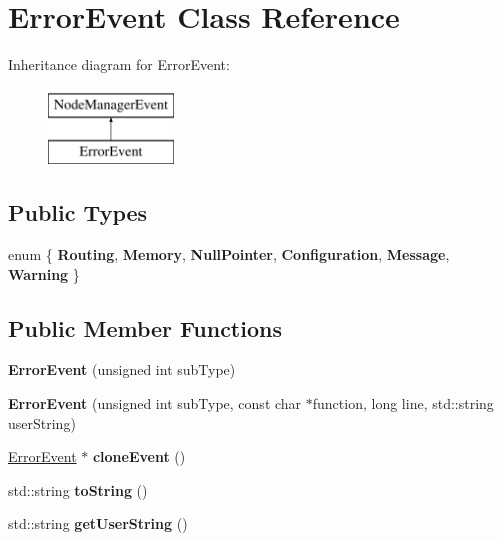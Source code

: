\hypertarget{class_error_event}{\section{\-Error\-Event \-Class \-Reference}
\label{class_error_event}
}
\-Inheritance diagram for \-Error\-Event\-:\begin{figure}[H]
\begin{center}
\leavevmode
\includegraphics[height=2.000000cm]{class_error_event}
\end{center}
\end{figure}
\subsection*{\-Public \-Types}
\begin{DoxyCompactItemize}
\item 
enum \{ \*
{\bfseries \-Routing}, 
{\bfseries \-Memory}, 
{\bfseries \-Null\-Pointer}, 
{\bfseries \-Configuration}, 
\*
{\bfseries \-Message}, 
{\bfseries \-Warning}
 \}
\end{DoxyCompactItemize}
\subsection*{\-Public \-Member \-Functions}
\begin{DoxyCompactItemize}
\item 
\hypertarget{class_error_event_abad30ca0f37fd9b47fd4e923a4bb10a0}{{\bfseries \-Error\-Event} (unsigned int sub\-Type)}\label{class_error_event_abad30ca0f37fd9b47fd4e923a4bb10a0}

\item 
\hypertarget{class_error_event_add7150eade6a6bf9cc390739cecb0091}{{\bfseries \-Error\-Event} (unsigned int sub\-Type, const char $\ast$function, long line, std\-::string user\-String)}\label{class_error_event_add7150eade6a6bf9cc390739cecb0091}

\item 
\hypertarget{class_error_event_ade13d39982a8ebd4235d30e12593c37e}{\hyperlink{class_error_event}{\-Error\-Event} $\ast$ {\bfseries clone\-Event} ()}\label{class_error_event_ade13d39982a8ebd4235d30e12593c37e}

\item 
\hypertarget{class_error_event_aee585d0b32dff7d5cfd4653b3b612578}{std\-::string {\bfseries to\-String} ()}\label{class_error_event_aee585d0b32dff7d5cfd4653b3b612578}

\item 
\hypertarget{class_error_event_aa4ffc42728e78ba0a980d04c6630516d}{std\-::string {\bfseries get\-User\-String} ()}\label{class_error_event_aa4ffc42728e78ba0a980d04c6630516d}

\end{DoxyCompactItemize}
